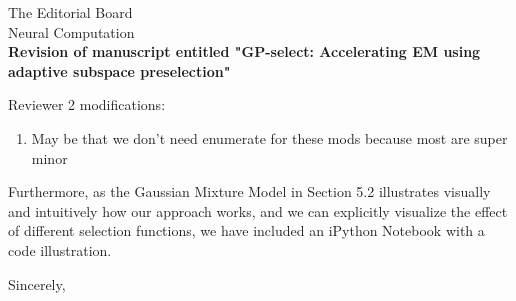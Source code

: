 \documentclass[10pt]{letter}
\begin{document}
\begin{letter}{
The Editorial Board\\
Neural Computation\\
\vspace{10mm}
\textbf{Revision of manuscript entitled "GP-select: Accelerating EM using adaptive
subspace preselection"}
}
\begin{enumerate}
\end{enumerate}


Reviewer 2 modifications:

\begin{enumerate}
    \item May be that we don't need enumerate for these mods because most are super minor
\end{enumerate}

Furthermore, as the Gaussian Mixture Model in Section 5.2 illustrates visually and intuitively how our approach works, and we can explicitly visualize the effect of different selection functions, we have included an iPython Notebook with a code illustration.

\noindent \vspace{.1in}\closing{Sincerely,\vspace{-5mm}}
\end{letter}
\end{document}
